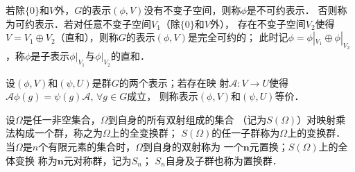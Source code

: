 \begin{definition}\label{chtop:def_irreducible-representation}
    若除$\{0\}$和$V$外，$G$的表示$(\phi,V)$没有不变子空间，则称$\phi$是{\heiti 不可约表示}．
    否则称为{\heiti 可约表示}．若对任意不变子空间$V_1$（除$\{0\}$和$V$外），
    存在不变子空间$V_2$使得$V=V_1\oplus V_2$（直和），则称$G$的表示$(\phi,V)$是{\heiti 完全可约的}；
    此时记$\phi=\phi|_{V_1}\oplus \phi|_{V_2}$，称$\phi$是子表示$\phi|_{V_1}$与$\phi|_{V_2}$的{\heiti 直和}．
\end{definition}


\begin{definition}
    设$(\phi,V)$和$(\psi,U)$是群$G$的两个表示；若存在映
    射$\mathcal{A}:V\to U$使得$\mathcal{A}\phi(g) = \psi(g)\mathcal{A},\, \forall g\in G$成立，
    则称表示$(\phi,V)$和$(\psi,U)${\heiti 等价}．
\end{definition}



\begin{definition}
    设$\Omega$是任一非空集合，$\Omega$到自身的所有{\kaishu 双射}组成的集合
    （记为$S(\Omega)$）对映射乘法构成一个群，称之为$\Omega$上的{\heiti 全变换群}；
    $S(\Omega)$的任一子群称为$\Omega$上的{\heiti 变换群}．
    当$\Omega$是$n$个有限元素的集合时，$\Omega$到自身的{\kaishu 双射}称为
    一个{\heiti $\boldsymbol{n}$元置换}；$S(\Omega)$上的全体变换
    称为{\heiti $\boldsymbol{n}$元对称群}，记为$S_n$；
    $S_n$自身及子群也称为{\heiti 置换群}．
\end{definition}

    

